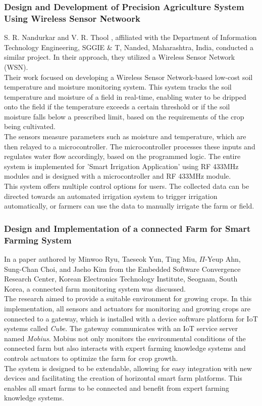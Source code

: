 \documentclass[12pt, a4paper]{article}
\begin{document}
\subsubsection{Design and Development of Precision Agriculture System Using Wireless Sensor Netwoork}
S. R. Nandurkar and V. R. Thool \cite{6808017}, affiliated with the Department of Information Technology Engineering, SGGIE & T, Nanded, Maharashtra, India, conducted a similar project. In their approach, they utilized a Wireless Sensor Network (WSN).\\
Their work focused on developing a Wireless Sensor Network-based low-cost soil temperature and moisture monitoring system. This system tracks the soil temperature and moisture of a field in real-time, enabling water to be dripped onto the field if the temperature exceeds a certain threshold or if the soil moisture falls below a prescribed limit, based on the requirements of the crop being cultivated.\\
The sensors measure parameters such as moisture and temperature, which are then relayed to a microcontroller. The microcontroller processes these inputs and regulates water flow accordingly, based on the programmed logic. The entire system is implemented for 'Smart Irrigation Application' using RF 433MHz modules and is designed with a microcontroller and RF 433MHz module.\\
This system offers multiple control options for users. The collected data can be directed towards an automated irrigation system to trigger irrigation automatically, or farmers can use the data to manually irrigate the farm or field.

\subsubsection{Design and Implementation of a connected Farm for Smart Farming System}
In a paper authored by Minwoo Ryu, Taeseok Yun, Ting Miu, $\Pi$-Yeup Ahn, Sung-Chan Choi, and Jaeho Kim \cite{7370624} from the Embedded Software Convergence Research Center, Korean Electronics Technology Institute, Seognam, South Korea, a connected farm monitoring system was discussed.\\
The research aimed to provide a suitable environment for growing crops. In this implementation, all sensors and actuators for monitoring and growing crops are connected to a gateway, which is installed with a device software platform for IoT systems called \emph{Cube}. The gateway communicates with an IoT service server named \emph{Mobius}. Mobius not only monitors the environmental conditions of the connected farm but also interacts with expert farming knowledge systems and controls actuators to optimize the farm for crop growth.\\
The system is designed to be extendable, allowing for easy integration with new devices and facilitating the creation of horizontal smart farm platforms. This enables all smart farms to be connected and benefit from expert farming knowledge systems.    
  
\end{document}

